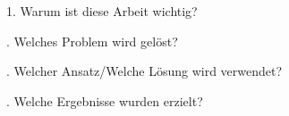 1. Warum ist diese Arbeit wichtig?

. Welches Problem wird gelöst?

. Welcher Ansatz/Welche Lösung wird verwendet?

. Welche Ergebnisse wurden erzielt?

